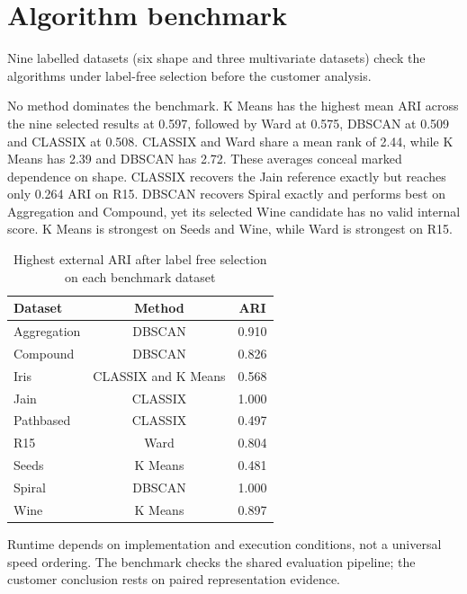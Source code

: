 \section{Algorithm benchmark}

Nine labelled datasets (six shape and three multivariate datasets) check the algorithms under label-free selection before the customer analysis.

No method dominates the benchmark. K Means has the highest mean ARI across the nine selected results at 0.597, followed by Ward at 0.575, DBSCAN at 0.509 and CLASSIX at 0.508. CLASSIX and Ward share a mean rank of 2.44, while K Means has 2.39 and DBSCAN has 2.72. These averages conceal marked dependence on shape. CLASSIX recovers the Jain reference exactly but reaches only 0.264 ARI on R15. DBSCAN recovers Spiral exactly and performs best on Aggregation and Compound, yet its selected Wine candidate has no valid internal score. K Means is strongest on Seeds and Wine, while Ward is strongest on R15.

\begin{table}[htbp]
\centering
\caption{Highest external ARI after label free selection on each benchmark dataset}
\label{tab:benchmark_winners}
\begin{tabular}{lcc}
\toprule
Dataset & Method & ARI \\
\midrule
Aggregation & DBSCAN & 0.910 \\
Compound & DBSCAN & 0.826 \\
Iris & CLASSIX and K Means & 0.568 \\
Jain & CLASSIX & 1.000 \\
Pathbased & CLASSIX & 0.497 \\
R15 & Ward & 0.804 \\
Seeds & K Means & 0.481 \\
Spiral & DBSCAN & 1.000 \\
Wine & K Means & 0.897 \\
\bottomrule
\end{tabular}
\end{table}

Runtime depends on implementation and execution conditions, not a universal speed ordering. The benchmark checks the shared evaluation pipeline; the customer conclusion rests on paired representation evidence.
